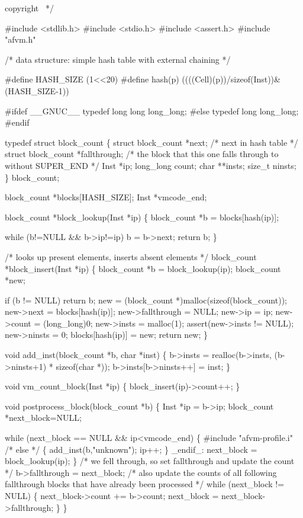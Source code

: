 \documentclass[10pt,english]{article}
\begin{document}
\LA{}copyright~{\nwtagstyle{}}\RA{}
*/

#include <stdlib.h>
#include <stdio.h>
#include <assert.h>
#include "afvm.h"

/* data structure: simple hash table with external chaining */

#define HASH_SIZE (1<<20)
#define hash(p) ((((Cell)(p))/sizeof(Inst))&(HASH_SIZE-1))

#ifdef __GNUC__
typedef long long long_long;
#else
typedef long long_long;
#endif

typedef struct block_count \{
  struct block_count *next; /* next in hash table */
  struct block_count *fallthrough; /* the block that this one falls
                                       through to without SUPER_END */
  Inst *ip;
  long_long count;
  char **insts;
  size_t ninsts;
\} block_count;

block_count *blocks[HASH_SIZE];
Inst *vmcode_end;

block_count *block_lookup(Inst *ip)
\{
  block_count *b = blocks[hash(ip)];

  while (b!=NULL && b->ip!=ip)
    b = b->next;
  return b;
\}

/* looks up present elements, inserts absent elements */
block_count *block_insert(Inst *ip)
\{
  block_count *b = block_lookup(ip);
  block_count *new;

  if (b != NULL)
    return b;
  new = (block_count *)malloc(sizeof(block_count));
  new->next = blocks[hash(ip)];
  new->fallthrough = NULL;
  new->ip = ip;
  new->count = (long_long)0;
  new->insts = malloc(1);
  assert(new->insts != NULL);
  new->ninsts = 0;
  blocks[hash(ip)] = new;
  return new;
\}

void add_inst(block_count *b, char *inst)
\{
  b->insts = realloc(b->insts, (b->ninsts+1) * sizeof(char *));
  b->insts[b->ninsts++] = inst;
\}

void vm_count_block(Inst *ip)
\{
  block_insert(ip)->count++;
\}

void postprocess_block(block_count *b)
\{
  Inst *ip = b->ip;
  block_count *next_block=NULL;

  while (next_block == NULL && ip<vmcode_end) \{
#include "afvm-profile.i"
    /* else */
    \{
      add_inst(b,"unknown");
      ip++;
    \}
  _endif_:
    next_block = block_lookup(ip);
  \}
  /* we fell through, so set fallthrough and update the count */
  b->fallthrough = next_block;
  /* also update the counts of all following fallthrough blocks that
     have already been processed */
  while (next_block != NULL) \{
    next_block->count += b->count;
    next_block = next_block->fallthrough;
  \}
\}
\end{document}

